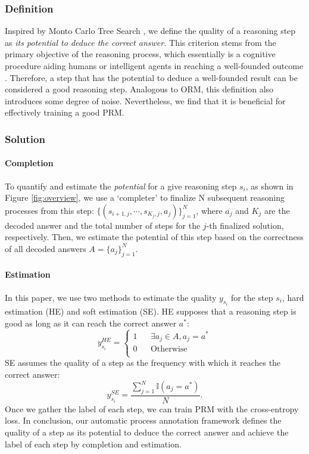 \documentclass{article} %
\begin{document}
\subsubsection{Definition} Inspired by Monto Carlo Tree Search \citep{kocsis2006bandit,coulom2006efficient,silver2016mastering,swiechowski2023monte}, we define the quality of a reasoning step as \textit{its potential to deduce the correct answer.}
This criterion stems from the primary objective of the reasoning process, which essentially is a cognitive procedure aiding humans or intelligent agents in reaching a well-founded outcome \citep{huang-chang-2023-towards}. Therefore, a step that has the potential to deduce a well-founded result can be considered a good reasoning step.  Analogous to ORM, this definition also introduces some degree of noise. Nevertheless, we find that it is beneficial for effectively training a good PRM.

\subsubsection{Solution}


\paragraph{Completion} To quantify and estimate the \textit{potential} for a give reasoning step $s_i$, 
as shown in Figure \ref{fig:overview},
we use a `completer' to finalize N subsequent reasoning processes from this step: $\{(s_{i+1,j}, \cdots, s_{K_j,j}, a_j)\}_{j=1}^N$, where $a_j$ and $K_j$ are the decoded answer and the total number of steps for the $j$-th finalized solution, respectively.
Then, we estimate the potential of this step based on the correctness of all decoded answers $A=\{a_j\}_{j=1}^N$. 

\paragraph{Estimation} In this paper, we use two methods to estimate the quality $y_{s_i}$ for the step $s_i$, hard estimation (HE) and soft estimation (SE). HE supposes that a reasoning step is good as long as it can reach the correct answer $a^*$:
\begin{equation}
y_{s_i}^{HE}=\left\{
\begin{aligned}
1 & & \exists a_j \in A, a_j = a^*\\
0 & & \mathrm{Otherwise} \\
\end{aligned}
\right.
\end{equation}
SE assumes the quality of a step as the frequency with which it reaches the correct answer:
\begin{equation}
    y_{s_i}^{SE} = \frac{\sum_{j=1}^N\mathbb{I} (a_j = a^*)}{N}.
\end{equation}
Once we gather the label of each step, we can train PRM with the cross-entropy loss.
In conclusion, our automatic process annotation framework defines the quality of a step as its potential to deduce the correct answer and achieve the label of each step by completion and estimation. 
\end{document}
